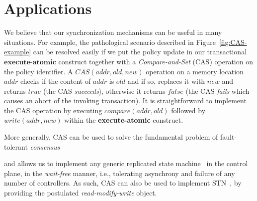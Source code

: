 \documentclass[conference]{sigcomm-alternate}
\newcommand{\hide}[1]{}
\newcommand{\cas}{CAS\xspace}
\newcommand{\compare}{compare\xspace}
\newcommand{\memwrite}{write\xspace}
\newcommand{\addr}{\textit{addr}\xspace}
\newcommand{\execatomic}{\textbf{execute-atomic}}
\newcommand{\true}{\textit{true}}
\newcommand{\false}{\textit{false}}
\begin{document}
\section{Applications}\label{sec:apps}

We believe that our synchronization mechanisms 
can be useful in many situations. 
For example, the pathological scenario described in 
Figure~\ref{fig:CAS-example} can be resolved easily if we put
the policy update in our transactional $\execatomic$ construct together
 with a \emph{Compare-and-Set} (CAS) operation on the policy identifier.
A $\cas(\addr,\textit{old},\textit{new})$ operation on a memory location $\addr$
checks if the content of $\addr$ is $\textit{old}$ and if so,
replaces it with $\textit{new}$ and returns $\true$ (the CAS
\emph{succeeds}), otherwise it returns $\false$ (the CAS
\emph{fails} which causes an abort of
the invoking transaction).
It is straightforward to implement the CAS operation by executing
$\textit{\compare}(\addr, old)$ followed by $\textit{\memwrite}(\addr,
new)$ within the {\execatomic} construct.

\hide{
As can be seen Algorithm \ref{alg:cas}, CAS is implemented by two commands. These commands should be sent as part of the same bundle

\begin{algorithm}[t]
    \caption{$\textit{\cas}(\addr, old,new)$}
    \label{alg:cas}
    \begin{algorithmic}[1]

    		\State $cmd1\gets \textsc{\compare}(\addr, old) $
    		\State $cmd2\gets \textsc{\memwrite}(\addr, new) $
			\Return $cmd1,cmd2$
    \end{algorithmic}
\end{algorithm}
}

More generally, CAS can be used to solve the fundamental
problem of fault-tolerant \emph{consensus}~\cite{FLP85}
\hide{%
 in which the controllers
need to agree on one of their private inputs, despite failures of an
arbitrary number of controllers.
Indeed, each controller simply performs, within a transaction, a CAS operation to replace the default value
in a memory location at the meta-configuration of a data plane switch.
If the transaction commits, the controller considers itself
the \emph{winner} and decides on its input,
if it aborts (the controller fails in the CAS), it remains to read the
memory to get the input of the winner and decide on it.
}
and allows us
to implement any generic replicated state machine~\cite{Her91}
in the control plane,  in the \emph{wait-free} manner, i.e., tolerating
asynchrony and failure of any number of controllers.
As such, CAS can also be used to implement STN~\cite{stn},
by providing the postulated \emph{read-modify-write} object.
\end{document}
